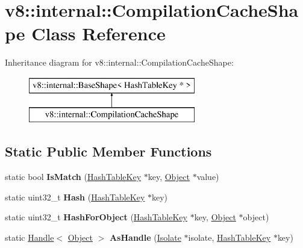 \hypertarget{classv8_1_1internal_1_1_compilation_cache_shape}{}\section{v8\+:\+:internal\+:\+:Compilation\+Cache\+Shape Class Reference}
\label{classv8_1_1internal_1_1_compilation_cache_shape}
Inheritance diagram for v8\+:\+:internal\+:\+:Compilation\+Cache\+Shape\+:\begin{figure}[H]
\begin{center}
\leavevmode
\includegraphics[height=2.000000cm]{classv8_1_1internal_1_1_compilation_cache_shape}
\end{center}
\end{figure}
\subsection*{Static Public Member Functions}
\begin{DoxyCompactItemize}
\item 
static bool {\bfseries Is\+Match} (\hyperlink{classv8_1_1internal_1_1_hash_table_key}{Hash\+Table\+Key} $\ast$key, \hyperlink{classv8_1_1internal_1_1_object}{Object} $\ast$value)\hypertarget{classv8_1_1internal_1_1_compilation_cache_shape_a613407fc3120722d21293dfe69f34521}{}\label{classv8_1_1internal_1_1_compilation_cache_shape_a613407fc3120722d21293dfe69f34521}

\item 
static uint32\+\_\+t {\bfseries Hash} (\hyperlink{classv8_1_1internal_1_1_hash_table_key}{Hash\+Table\+Key} $\ast$key)\hypertarget{classv8_1_1internal_1_1_compilation_cache_shape_acf5dcd22e8ab7845ab33d4f0401bb312}{}\label{classv8_1_1internal_1_1_compilation_cache_shape_acf5dcd22e8ab7845ab33d4f0401bb312}

\item 
static uint32\+\_\+t {\bfseries Hash\+For\+Object} (\hyperlink{classv8_1_1internal_1_1_hash_table_key}{Hash\+Table\+Key} $\ast$key, \hyperlink{classv8_1_1internal_1_1_object}{Object} $\ast$object)\hypertarget{classv8_1_1internal_1_1_compilation_cache_shape_a92530449c3ec57237cc140519cb66130}{}\label{classv8_1_1internal_1_1_compilation_cache_shape_a92530449c3ec57237cc140519cb66130}

\item 
static \hyperlink{classv8_1_1internal_1_1_handle}{Handle}$<$ \hyperlink{classv8_1_1internal_1_1_object}{Object} $>$ {\bfseries As\+Handle} (\hyperlink{classv8_1_1internal_1_1_isolate}{Isolate} $\ast$isolate, \hyperlink{classv8_1_1internal_1_1_hash_table_key}{Hash\+Table\+Key} $\ast$key)\hypertarget{classv8_1_1internal_1_1_compilation_cache_shape_a272f412497695e4cb08f4c04063c6714}{}\label{classv8_1_1internal_1_1_compilation_cache_shape_a272f412497695e4cb08f4c04063c6714}

\end{DoxyCompactItemize}
